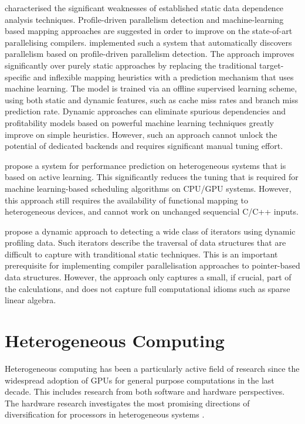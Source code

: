     \citet{Tournavitis:2009:THA:1542476.1542496} characterised the significant
    weaknesses of established static data dependence analysis techniques.
    Profile-driven parallelism detection and machine-learning based mapping
    approaches are suggested in order to improve on the state-of-art
    parallelising compilers.
    \citet{Wang:2014:IPP:2591460.2579561} implemented such a system that
    automatically discovers parallelism based on profile-driven parallelism
    detection.
    The approach improves significantly over purely static approaches by
    replacing the traditional target-specific and inflexible mapping heuristics
    with a prediction mechanism that uses machine learning.
    The model is trained via an offline supervised learning scheme, using both
    static and dynamic features, such as cache miss rates and branch miss
    prediction rate.
    Dynamic approaches can eliminate spurious dependencies and profitability
    models based on powerful machine learning techniques greatly improve on
    simple heuristics.
    However, such an approach cannot unlock the potential of dedicated backends
    and requires significant manual tuning effort.

    \citet{Ogilvie:2014:ALA:2628071.2628128} propose a system for performance
    prediction on heterogeneous systems that is based on active learning.
    This significantly reduces the tuning that is required for
    machine learning-based scheduling algorithms on CPU/GPU systems.
    However, this approach still requires the availability of functional mapping
    to heterogeneous devices, and cannot work on unchanged sequencial C/C++
    inputs.

    \citet{Manilov:2018:GPI:3178372.3179511} propose a dynamic approach to
    detecting a wide class of iterators using dynamic profiling data.
    Such iterators describe the traversal of data structures that are difficult
    to capture with tranditional static techniques.
    This is an important prerequisite for implementing compiler parallelisation
    approaches to pointer-based data structures.
    However, the approach only captures a small, if crucial, part of the
    calculations, and does not capture full computational idioms such
    as sparse linear algebra.

\section{Heterogeneous Computing}

    Heterogeneous computing has been a particularly active field of research
    since the widespread adoption of GPUs for general purpose computations in
    the last decade.
    This includes research from both software and hardware perspectives.
    The hardware research investigates the most promising directions of
    diversification for processors in heterogeneous systems
    \citep{Tomusk:2016:SHC:3012405.3014165}.

